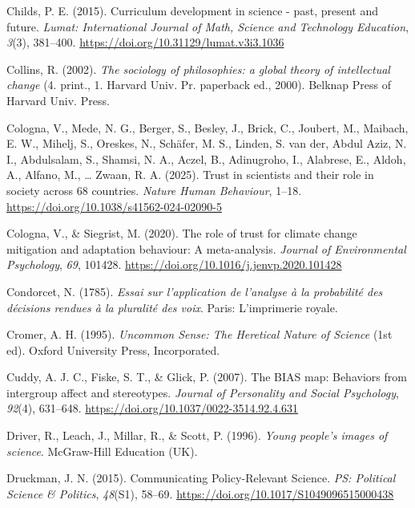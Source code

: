 \documentclass[
  jou,
  floatsintext,
  longtable,
  nolmodern,
  notxfonts,
  notimes,
  colorlinks=true,linkcolor=blue,citecolor=blue,urlcolor=blue]{apa7}
\newlength{\cslhangindent}
\newenvironment{CSLReferences}[2] %
 {\begin{list}{}{%
  \setlength{\itemindent}{0pt}
  \setlength{\leftmargin}{0pt}
  \setlength{\parsep}{0pt}
  \ifodd #1
   \setlength{\leftmargin}{\cslhangindent}
   \setlength{\itemindent}{-1\cslhangindent}
  \fi
  \setlength{\itemsep}{#2\baselineskip}}}
 {\end{list}}
\begin{document}
\begin{CSLReferences}{1}{0}
Childs, P. E. (2015). Curriculum development in science - past, present
and future. \emph{Lumat: International Journal of Math, Science and
Technology Education}, \emph{3}(3), 381--400.
\url{https://doi.org/10.31129/lumat.v3i3.1036}

Collins, R. (2002). \emph{The sociology of philosophies: a global theory
of intellectual change} (4. print., 1. Harvard Univ. Pr. paperback ed.,
2000). Belknap Press of Harvard Univ. Press.

Cologna, V., Mede, N. G., Berger, S., Besley, J., Brick, C., Joubert,
M., Maibach, E. W., Mihelj, S., Oreskes, N., Schäfer, M. S., Linden, S.
van der, Abdul Aziz, N. I., Abdulsalam, S., Shamsi, N. A., Aczel, B.,
Adinugroho, I., Alabrese, E., Aldoh, A., Alfano, M., \ldots{} Zwaan, R.
A. (2025). Trust in scientists and their role in society across 68
countries. \emph{Nature Human Behaviour}, 1--18.
\url{https://doi.org/10.1038/s41562-024-02090-5}

Cologna, V., \& Siegrist, M. (2020). The role of trust for climate
change mitigation and adaptation behaviour: A meta-analysis.
\emph{Journal of Environmental Psychology}, \emph{69}, 101428.
\url{https://doi.org/10.1016/j.jenvp.2020.101428}

Condorcet, N. (1785). \emph{Essai sur l'application de l'analyse à la
probabilité des décisions rendues à la pluralité des voix}. Paris:
L{'}imprimerie royale.

Cromer, A. H. (1995). \emph{Uncommon Sense: The Heretical Nature of
Science} (1st ed). Oxford University Press, Incorporated.

Cuddy, A. J. C., Fiske, S. T., \& Glick, P. (2007). The BIAS map:
Behaviors from intergroup affect and stereotypes. \emph{Journal of
Personality and Social Psychology}, \emph{92}(4), 631--648.
\url{https://doi.org/10.1037/0022-3514.92.4.631}

Driver, R., Leach, J., Millar, R., \& Scott, P. (1996). \emph{Young
people's images of science}. McGraw-Hill Education (UK).

Druckman, J. N. (2015). Communicating Policy-Relevant Science. \emph{PS:
Political Science \& Politics}, \emph{48}(S1), 58--69.
\url{https://doi.org/10.1017/S1049096515000438}


\end{CSLReferences}
\end{document}
